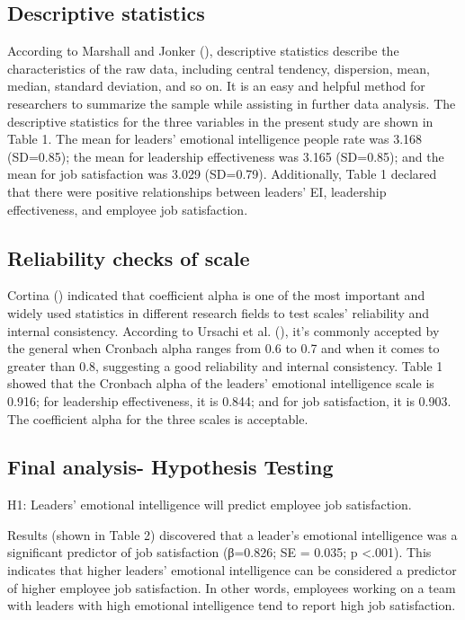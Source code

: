 \documentclass[
  man,
  longtable,
  nolmodern,
  notxfonts,
  notimes,
  colorlinks=true,linkcolor=blue,citecolor=blue,urlcolor=blue]{apa7}
\begin{document}
\subsection{Descriptive statistics}\label{descriptive-statistics}

According to Marshall and Jonker (),
descriptive statistics describe the characteristics of the raw data,
including central tendency, dispersion, mean, median, standard
deviation, and so on. It is an easy and helpful method for researchers
to summarize the sample while assisting in further data analysis. The
descriptive statistics for the three variables in the present study are
shown in Table 1. The mean for leaders' emotional intelligence people
rate was 3.168 (SD=0.85); the mean for leadership effectiveness was
3.165 (SD=0.85); and the mean for job satisfaction was 3.029 (SD=0.79).
Additionally, Table 1 declared that there were positive relationships
between leaders' EI, leadership effectiveness, and employee job
satisfaction.

\subsection{Reliability checks of
scale}\label{reliability-checks-of-scale}

Cortina () indicated that coefficient
alpha is one of the most important and widely used statistics in
different research fields to test scales' reliability and internal
consistency. According to Ursachi et al.
(), it's commonly accepted by the
general when Cronbach alpha ranges from 0.6 to 0.7 and when it comes to
greater than 0.8, suggesting a good reliability and internal
consistency. Table 1 showed that the Cronbach alpha of the leaders'
emotional intelligence scale is 0.916; for leadership effectiveness, it
is 0.844; and for job satisfaction, it is 0.903. The coefficient alpha
for the three scales is acceptable.

\subsection{Final analysis- Hypothesis
Testing}\label{final-analysis--hypothesis-testing}

H1: Leaders' emotional intelligence will predict employee job
satisfaction.

Results (shown in Table 2) discovered that a leader's emotional
intelligence was a significant predictor of job satisfaction (β=0.826;
SE = 0.035; p \textless.001). This indicates that higher leaders'
emotional intelligence can be considered a predictor of higher employee
job satisfaction. In other words, employees working on a team with
leaders with high emotional intelligence tend to report high job
satisfaction.
\end{document}
